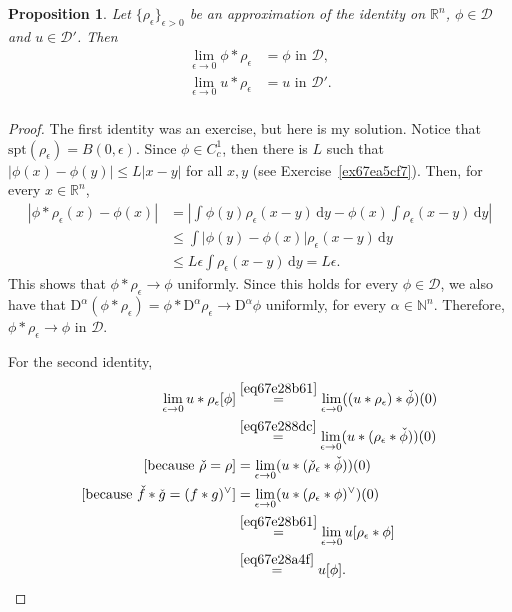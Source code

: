 \documentclass[a4paper,9pt]{amsart}
\newcommand{\scr}[1]{\mathscr{#1}}
\newcommand{\N}{\mathbb{N}}	%
\newcommand{\R}{\mathbb{R}}	%
\newcommand{\did}{\,\mathrm{d}}	%
\newcommand{\Diff}{\mathrm{D}}
\newcommand{\spt}{\mathrm{spt}}
\theoremstyle{plain}
\newtheorem{proposition}{Proposition}[section]
\theoremstyle{definition}
\theoremstyle{remark}
\begin{document}
\begin{proposition}\label{prop67e28cab}
	Let $\{\rho_\epsilon\}_{\epsilon>0}$ be an approximation of the identity on $\R^n$,
	$\phi\in\scr D$ and $u\in\scr D'$.
	Then
	\begin{align}
	\label{eq67e28a4f}
		\lim_{\epsilon\to0} \phi*\rho_\epsilon &= \phi \text{ in }\scr D , \\
	\label{eq67e28a56}
		\lim_{\epsilon\to0} u*\rho_\epsilon &= u \text{ in }\scr D' .\\
	\end{align}
\end{proposition}
\begin{proof}
	The first identity was an exercise, but here is my solution.
	Notice that $\spt(\rho_\epsilon) = B(0,\epsilon)$.
	Since $\phi\in C^1_c$, then there is $L$ such that $|\phi(x)-\phi(y)|\le L|x-y|$ for all $x,y$ (see Exercise~\ref{ex67ea5cf7}).
	Then, for every $x\in\R^n$,
	\begin{align*}
	 	|\phi*\rho_\epsilon(x) - \phi(x) | 
		&= \left|\int \phi(y) \rho_\epsilon(x-y) \did y - \phi(x) \int \rho_\epsilon(x-y) \did y \right| \\
		&\le \int |\phi(y) - \phi(x)| \rho_\epsilon(x-y) \did y \\
		&\le L\epsilon \int \rho_\epsilon(x-y) \did y 
		= L\epsilon.
	\end{align*}
	This shows that $\phi*\rho_\epsilon\to \phi$ uniformly.
	Since this holds for every $\phi\in\scr D$,
	we also have that $\Diff^\alpha(\phi*\rho_\epsilon) = \phi*\Diff^\alpha\rho_\epsilon \to \Diff^\alpha\phi$ uniformly, for every $\alpha\in\N^n$.
	Therefore, $\phi*\rho_\epsilon\to \phi$ in $\scr D$.
	
	For the second identity, 
	\begin{align}
	\lim_{\epsilon\to0} u*\rho_\epsilon[\phi]
	&\overset{\eqref{eq67e28b61}}= \lim_{\epsilon\to0} ((u*\rho_\epsilon)*\check\phi)(0) \\
	&\overset{\eqref{eq67e288dc}}= \lim_{\epsilon\to0} (u*(\rho_\epsilon*\check\phi))(0) \\
	[\text{because $\check\rho=\rho$}]
	&= \lim_{\epsilon\to0} (u*(\check\rho_\epsilon*\check\phi))(0) \\
	[\text{because $\check f*\check g = (f*g)^\vee$}]
	&= \lim_{\epsilon\to0} (u*(\rho_\epsilon*\phi)^\vee)(0) \\
	&\overset{\eqref{eq67e28b61}}= \lim_{\epsilon\to0} u[\rho_\epsilon*\phi] \\
	&\overset{\eqref{eq67e28a4f}}= u[\phi] .
	\end{align}
\end{proof}
\end{document}
